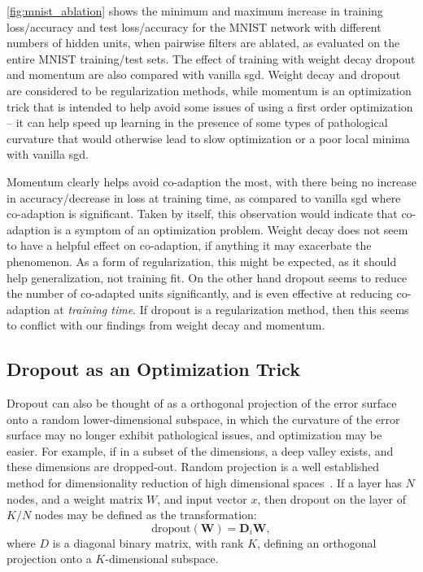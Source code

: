 \documentclass[thesis]{subfiles}
\begin{document}
\cref{fig:mnist_ablation} shows the minimum and maximum increase in training loss/accuracy and test loss/accuracy for the MNIST network with different numbers of hidden units, when pairwise filters are ablated, as evaluated on the entire MNIST training/test sets. The effect of training with weight decay dropout and momentum are also compared with vanilla \gls{sgd}. Weight decay and dropout are considered to be regularization methods, while momentum is an optimization trick that is intended to help avoid some issues of using a first order optimization -- it can help speed up learning in the presence of some types of pathological curvature that would otherwise lead to slow optimization or a poor local minima with vanilla \gls{sgd}.

Momentum clearly helps avoid co-adaption the most, with there being no increase in accuracy/decrease in loss at training time, as compared to vanilla \gls{sgd} where co-adaption is significant. Taken by itself, this observation would indicate that co-adaption is a symptom of an optimization problem. Weight decay does not seem to have a helpful effect on co-adaption, if anything it may exacerbate the phenomenon. As a form of regularization, this might be expected, as it should help generalization, not training fit. On the other hand dropout seems to reduce the number of co-adapted units significantly, and is even effective at reducing co-adaption at \emph{training time}. If dropout is a regularization method, then this seems to conflict with our findings from weight decay and momentum.

\subsection{Dropout as an Optimization Trick}\label{dropoutasopttrick}
Dropout can also be thought of as a orthogonal projection of the error surface onto a random lower-dimensional subspace, in which the curvature of the error surface may no longer exhibit pathological issues, and optimization may be easier. For example, if in a subset of the dimensions, a deep valley exists, and these dimensions are dropped-out. Random projection is a well established method for dimensionality reduction of high dimensional spaces~\citep{kaski1998dimensionality,fodor2002survey}.
If a layer has $N$ nodes, and a weight matrix $W$, and input vector $x$, then dropout on the layer of $K/N$ nodes may be defined as the transformation:
\begin{equation}
    \textrm{dropout}(\mathbf{W}) = \mathbf{D}_{i} \mathbf{W},
\end{equation}
where $D$ is a diagonal binary matrix, with rank $K$, defining an orthogonal projection onto a $K$-dimensional subspace. 
\end{document}
